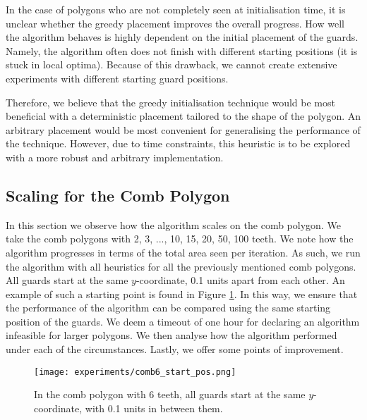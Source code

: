 In the case of polygons who are not completely seen at initialisation time, it is unclear whether the greedy placement improves the overall progress. How well the algorithm behaves is highly dependent on the initial placement of the guards. Namely, the algorithm often does not finish with different starting positions (it is stuck in local optima). Because of this drawback, we cannot create extensive experiments with different starting guard positions. 

Therefore, we believe that the greedy initialisation technique would be most beneficial with a deterministic placement tailored to the shape of the polygon. An arbitrary placement would be most convenient for generalising the performance of the technique. However, due to time constraints, this heuristic is to be explored with a more robust and arbitrary implementation.

\newpage
\subsection{Scaling for the Comb Polygon}
In this section we  observe how the algorithm scales on the comb polygon. We  take the comb polygons with 2, 3, ..., 10, 15, 20, 50, 100 teeth. We  note how the algorithm progresses in terms of the total area seen per iteration.
As such, we  run the algorithm with all heuristics for all the previously mentioned comb polygons. All guards  start at the same $y$-coordinate, 0.1 units apart from each other. An example of such a starting point is found in Figure \ref{fig:comb6_start_pos}. In this way, we  ensure that the performance of the algorithm can be compared using the same starting position of the guards. We  deem a timeout of one hour for declaring an algorithm infeasible for larger polygons. We  then analyse how the algorithm performed under each of the circumstances. Lastly, we  offer some points of improvement.

\begin{figure}[h!]
    \centering
    \texttt{[image: experiments/comb6\_start\_pos.png]}
    \caption{In the comb polygon with 6 teeth, all guards start at the same $y$-coordinate, with 0.1 units in between them.}
    \label{fig:comb6_start_pos}
\end{figure}

